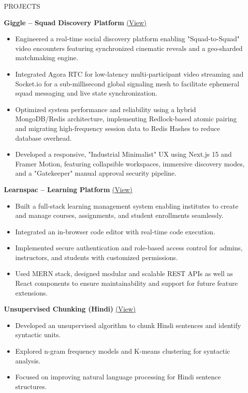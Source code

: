 \documentclass{resume}
\begin{document}
\begin{rSection}{PROJECTS}

  \textbf{Giggle – Squad Discovery Platform} \href{https://giggle-web-git-main-razorblade42s-projects.vercel.app/}{(View)}  
  \begin{itemize}
  \itemsep-0.5em 
      \item Engineered a real-time social discovery platform enabling "Squad-to-Squad" video encounters featuring synchronized cinematic reveals and a geo-sharded matchmaking engine.
      \item Integrated Agora RTC for low-latency multi-participant video streaming and Socket.io for a sub-millisecond global signaling mesh to facilitate ephemeral squad messaging and live
  state synchronization.
      \item Optimized system performance and reliability using a hybrid MongoDB/Redis architecture, implementing Redlock-based atomic pairing and migrating high-frequency session data to
  Redis Hashes to reduce database overhead.
      \item Developed a responsive, "Industrial Minimalist" UX using Next.js 15 and Framer Motion, featuring collapsible workspaces, immersive discovery modes, and a "Gatekeeper" manual
  approval security pipeline.

  \end{itemize}
  
\textbf{Learnspac – Learning Platform} \href{https://master.d23e6ad1u7odbc.amplifyapp.com}{(View)}  
\begin{itemize}
\itemsep-0.5em 
    \item Built a full-stack learning management system enabling institutes to create and manage courses, assignments, and student enrollments seamlessly.
    \item Integrated an in-browser code editor with real-time code execution.
    \item Implemented secure authentication and role-based access control for admins, instructors, and students with customized permissions.
    \item Used MERN stack, designed modular and scalable REST APIs as well as React components to ensure maintainability and support for future feature extensions.

\end{itemize}

\textbf{Unsupervised Chunking (Hindi)} \href{https://github.com/razorblade42/unsupervised-chunking}{(View)}  
\begin{itemize}
\itemsep-0.5em 
    \item Developed an unsupervised algorithm to chunk Hindi sentences and identify syntactic units.
    \item Explored n-gram frequency models and K-means clustering for syntactic analysis.
    \item Focused on improving natural language processing for Hindi sentence structures.
\end{itemize}

\end{rSection}
\end{document}
